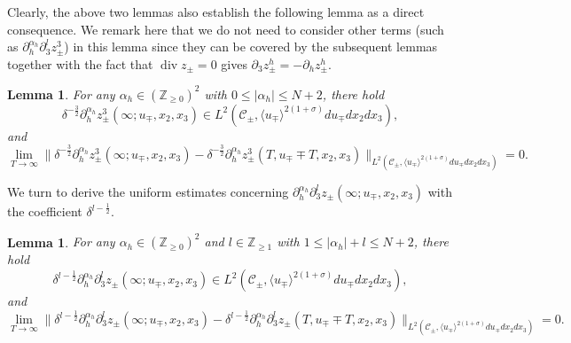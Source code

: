 \documentclass[10pt,reqno]{amsart}
\numberwithin{equation}{section}
\newtheorem{lemma}[theorem]{Lemma}
\begin{document}
Clearly, the above two lemmas also establish the following lemma as a direct consequence. We remark here that we do not need to consider other terms (such as  
 $\partial_h^{\alpha_h}\partial_3^lz^3_{\pm}$) in this lemma since they can be covered by the subsequent lemmas together with the fact that $\operatorname{div}z_\pm=0$ gives  $\partial_3z_\pm^h=-\partial_hz_\pm^h$.

\begin{lemma}\label{lemma5'}
	For any $\alpha_h\in(\mathbb{Z}_{\geqslant 0})^2$  with 
	$0\leqslant|\alpha_h|\leqslant N+2$, there hold
	\begin{equation*}
		\delta^{-\frac{3}{2}}\partial_h^{\alpha_h}z^3_{\pm}(\infty;u_\mp,x_2,x_3)\in L^2(\mathcal{C}_\pm,\langle u_\mp\rangle^{2(1+\sigma)}du_\mp dx_2dx_3),
	\end{equation*}
	and 
	\begin{equation*} 
		\lim_{T\to\infty}\Big\|\delta^{-\frac{3}{2}}\partial_h^{\alpha_h}z^3_{\pm}(\infty;u_\mp,x_2,x_3)-\delta^{-\frac{3}{2}}\partial_h^{\alpha_h}z^3_{\pm}(T,u_\mp\mp T,x_2,x_3)\Big\|_{L^2(\mathcal{C}_\pm,\langle u_\mp\rangle^{2(1+\sigma)}du_\mp dx_2dx_3)}=0.
	\end{equation*}
\end{lemma}


We turn to derive the uniform estimates concerning $\partial_h^{\alpha_h}\partial_3^lz_\pm(\infty;u_\mp,x_2,x_3)$ with the coefficient $\delta^{l-\frac{1}{2}}$.
 
\begin{lemma}\label{lemma6}
	For any $\alpha_h\in(\mathbb{Z}_{\geqslant 0})^2$ and $l\in\mathbb{Z}_{\geqslant 1}$ with 
	$1\leqslant|\alpha_h|+l\leqslant N+2$, there hold
	\begin{equation*}
\delta^{l-\frac{1}{2}}
	\partial_h^{\alpha_h}\partial_3^l z_{\pm}(\infty;u_\mp,x_2,x_3)\in L^2(\mathcal{C}_\pm,\langle u_\mp\rangle^{2(1+\sigma)}du_\mp dx_2dx_3),\end{equation*}
and 
\begin{equation*} 
	\lim_{T\to\infty}\Big\|\delta^{l-\frac{1}{2}}\partial_h^{\alpha_h}\partial_3^lz_{\pm}(\infty;u_\mp,x_2,x_3)-\delta^{l-\frac{1}{2}}\partial_h^{\alpha_h}\partial_3^lz_{\pm}(T,u_\mp\mp T,x_2,x_3)\Big\|_{L^2(\mathcal{C}_\pm,\langle u_\mp\rangle^{2(1+\sigma)}du_\mp dx_2dx_3)}=0.
\end{equation*}
\end{lemma}
 
\end{document}
